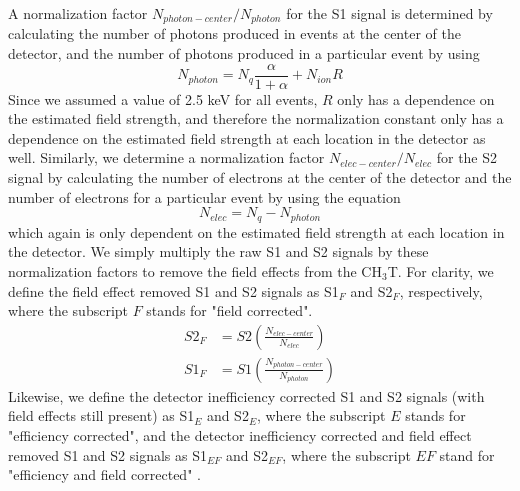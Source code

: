 A normalization factor $N_{photon-center}/N_{photon}$ for the S1 signal is determined by calculating the number of photons produced in events at the center of the detector, and the number of photons produced in a particular event by using
\begin{equation}
N_{photon} = N_q\frac{\alpha}{1+\alpha} + N_{ion}R
\end{equation}
Since we assumed a value of 2.5 keV for all events, $R$ only has a dependence on the estimated field strength, and therefore the normalization constant only has a dependence on the estimated field strength at each location in the detector as well.  Similarly, we determine a normalization factor $N_{elec-center}/N_{elec}$ for the S2 signal by calculating the number of electrons at the center of the detector and the number of electrons for a particular event by using the equation
\begin{equation}
N_{elec}=N_q-N_{photon}
\end{equation}
which again is only dependent on the estimated field strength at each location in the detector.  We simply multiply the raw S1 and S2 signals by these normalization factors to remove the field effects from the CH$_3$T.  For clarity, we define the field effect removed S1 and S2 signals as S1$_F$ and S2$_F$, respectively, where the subscript $F$ stands for "field corrected".   
\begin{align}
S2_F &=S2 \left( \frac{N_{elec-center}}{N_{elec}} \right) \\
S1_F &=S1 \left( \frac{N_{photon-center}}{N_{photon}} \right)
\end{align}
Likewise, we define the detector inefficiency corrected S1 and S2 signals (with field effects still present) as S1$_E$ and S2$_E$, where the subscript $E$ stands for "efficiency corrected", and the detector inefficiency corrected and field effect removed S1 and S2 signals as S1$_{EF}$ and S2$_{EF}$, where the subscript $EF$ stand for "efficiency and field corrected" . 

